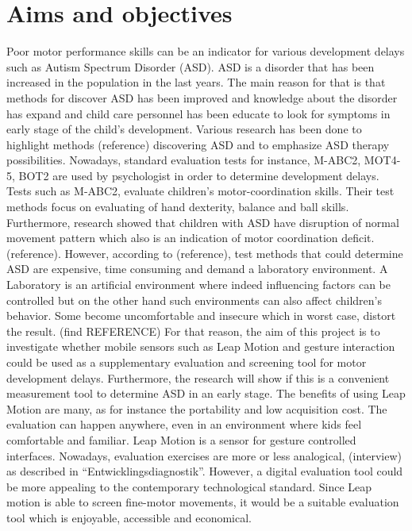 \chapter{Aims and objectives}
\label{chap:aim}

Poor motor performance skills can be an indicator for various development delays such as Autism Spectrum Disorder (ASD).
ASD is a disorder that has been increased in the population in the last years. The main reason for that is that methods for discover ASD has been improved and knowledge about the disorder has expand and child care personnel has been educate to look for symptoms in early stage of the child's development. %
Various research has been done to highlight methods (reference) discovering ASD and to emphasize ASD therapy possibilities. Nowadays, standard evaluation tests for instance, M-ABC2, MOT4-5, BOT2 are used by psychologist in order to determine development delays.%
Tests such as M-ABC2, evaluate children's motor-coordination skills. Their test methods focus on evaluating of hand dexterity, balance and ball skills. Furthermore, research showed that children with ASD have disruption of normal movement pattern which also is an indication of motor coordination deficit.(reference). However, according to (reference), test methods that could determine ASD are expensive, time consuming and demand a laboratory environment. A Laboratory is an artificial environment where indeed influencing factors can be controlled but on the other hand such environments can also affect children's behavior. Some become uncomfortable and insecure which in worst case, distort the result. (find REFERENCE) For that reason, the aim of this project is to investigate whether mobile sensors such as Leap Motion and gesture interaction could be used as a supplementary evaluation and screening tool for motor development delays. Furthermore, the research will show if this is a convenient measurement tool to determine ASD in an early stage. The benefits of using Leap Motion are many, as for instance the portability and low acquisition cost. The evaluation can happen anywhere, even in an environment where kids feel comfortable and familiar. Leap Motion is a sensor for gesture controlled interfaces. Nowadays, evaluation exercises are more or less analogical, (interview) as described in “Entwicklingsdiagnostik”. %
However, a digital evaluation tool could be more appealing to the contemporary technological standard. Since Leap motion is able to screen fine-motor movements, it would be a suitable evaluation tool which is enjoyable, accessible and economical.

